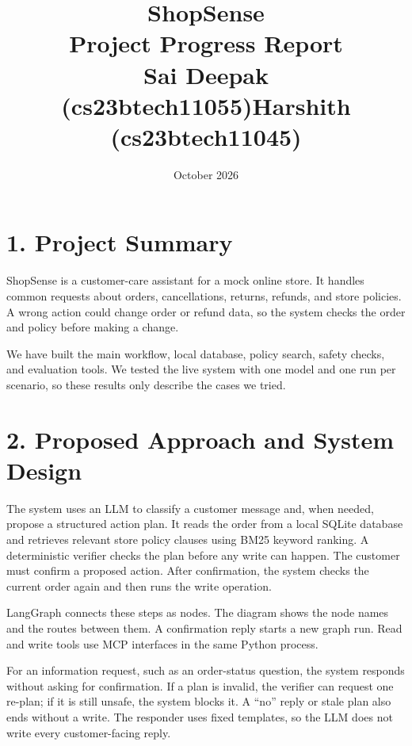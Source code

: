 \documentclass[11pt,a4paper]{article}
\title{\vspace{-2.4cm}\textbf{ShopSense}\\[6pt]
       \large Project Progress Report\\[9pt]
       Sai Deepak (cs23btech11055)\quad Harshith (cs23btech11045)}
\author{}
\date{October 2026}
\begin{document}
\maketitle
\vspace{-1.0cm}

\section*{1. Project Summary}

ShopSense is a customer-care assistant for a mock online store. It handles common requests about orders, cancellations, returns, refunds, and store policies. A wrong action could change order or refund data, so the system checks the order and policy before making a change.

We have built the main workflow, local database, policy search, safety checks, and evaluation tools. We tested the live system with one model and one run per scenario, so these results only describe the cases we tried.

\section*{2. Proposed Approach and System Design}

The system uses an LLM to classify a customer message and, when needed, propose a structured action plan. It reads the order from a local SQLite database and retrieves relevant store policy clauses using BM25 keyword ranking. A deterministic verifier checks the plan before any write can happen. The customer must confirm a proposed action. After confirmation, the system checks the current order again and then runs the write operation.

LangGraph connects these steps as nodes. The diagram shows the node names and the routes between them. A confirmation reply starts a new graph run. Read and write tools use MCP interfaces in the same Python process.

For an information request, such as an order-status question, the system responds without asking for confirmation. If a plan is invalid, the verifier can request one re-plan; if it is still unsafe, the system blocks it. A ``no'' reply or stale plan also ends without a write. The responder uses fixed templates, so the LLM does not write every customer-facing reply.
\end{document}

